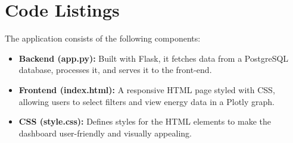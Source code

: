 \section{Code Listings}

The application consists of the following components:
\begin{itemize}
    \item \textbf{Backend (app.py):} Built with Flask, it fetches data from a PostgreSQL database, processes it, and serves it to the front-end.
    \item \textbf{Frontend (index.html):} A responsive HTML page styled with CSS, allowing users to select filters and view energy data in a Plotly graph.
    \item \textbf{CSS (style.css):} Defines styles for the HTML elements to make the dashboard user-friendly and visually appealing.
\end{itemize}



